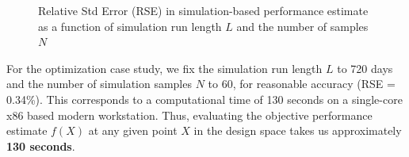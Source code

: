 \begin{figure}[!h]
  \vspace{-0.2cm}
  \centering
   {}
  \caption{Relative Std Error (RSE) in simulation-based performance estimate as a function of simulation run length $L$ and the number of samples $N$}
  \label{fig:compute_effort}  
\end{figure}
 For the optimization case study, we fix the simulation run length $L$ to 720 days and the number of simulation samples $N$ to 60, for reasonable accuracy (RSE = 0.34\%). This corresponds to a computational time of 130 seconds on a single-core x86 based modern workstation. Thus, evaluating the objective performance estimate $f(X)$ at any given point $X$ in the design space takes us approximately \textbf{130 seconds}.
